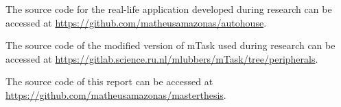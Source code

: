 The source code for the real-life application developed during research can be accessed at \url{https://github.com/matheusamazonas/autohouse}.

The source code of the modified version of \gls{mTask} used during research can be accessed at \url{https://gitlab.science.ru.nl/mlubbers/mTask/tree/peripherals}.

The source code of this report can be accessed at \url{https://github.com/matheusamazonas/masterthesis}.


